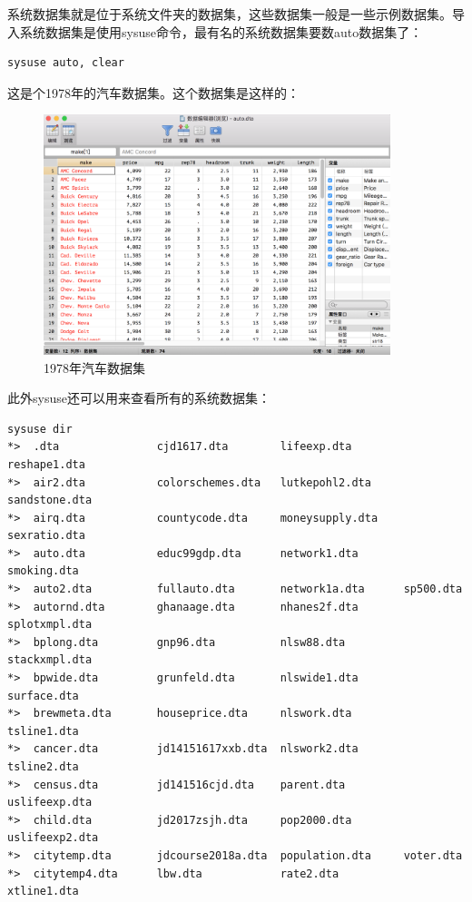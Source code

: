 系统数据集就是位于系统文件夹的数据集，这些数据集一般是一些示例数据集。导入系统数据集是使用sysuse命令，最有名的系统数据集要数auto数据集了：

\begin{lstlisting}
sysuse auto, clear
\end{lstlisting}

这是个1978年的汽车数据集。这个数据集是这样的：

\begin{figure}[htbp]
  \centering \includegraphics[width=0.9\textwidth]{assets/auto}
  \caption{1978年汽车数据集}
  \label{fig:auto}
\end{figure}

此外sysuse还可以用来查看所有的系统数据集：

\begin{lstlisting}
sysuse dir
*>  .dta               cjd1617.dta        lifeexp.dta        reshape1.dta
*>  air2.dta           colorschemes.dta   lutkepohl2.dta     sandstone.dta
*>  airq.dta           countycode.dta     moneysupply.dta    sexratio.dta
*>  auto.dta           educ99gdp.dta      network1.dta       smoking.dta
*>  auto2.dta          fullauto.dta       network1a.dta      sp500.dta
*>  autornd.dta        ghanaage.dta       nhanes2f.dta       splotxmpl.dta
*>  bplong.dta         gnp96.dta          nlsw88.dta         stackxmpl.dta
*>  bpwide.dta         grunfeld.dta       nlswide1.dta       surface.dta
*>  brewmeta.dta       houseprice.dta     nlswork.dta        tsline1.dta
*>  cancer.dta         jd14151617xxb.dta  nlswork2.dta       tsline2.dta
*>  census.dta         jd141516cjd.dta    parent.dta         uslifeexp.dta
*>  child.dta          jd2017zsjh.dta     pop2000.dta        uslifeexp2.dta
*>  citytemp.dta       jdcourse2018a.dta  population.dta     voter.dta
*>  citytemp4.dta      lbw.dta            rate2.dta          xtline1.dta
\end{lstlisting}

